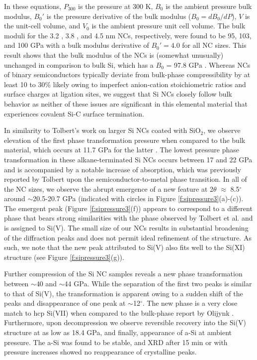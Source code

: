 In these equations, $P_{300}$ is the pressure at 300 K, $B_0$ is the ambient pressure bulk modulus, $B_0'$ is the pressure derivative of the bulk modulus ($B_0 = dB_0/dP$), $V$ is the unit-cell volume, and $V_0$ is the ambient pressure unit cell volume. The bulk moduli for the 3.2 , 3.8 , and 4.5 nm NCs, respectively, were found to be 95, 103, and 100 GPa with a bulk modulus derivative of $B_0' = 4.0$ for all NC sizes.  This result shows that the bulk modulus of the NCs is (somewhat unusually) unchanged in comparison to bulk Si, which has a $B_0$ = 97.8 GPa \cite{hull1999properties}. Whereas NCs of binary semiconductors typically deviate from bulk-phase compressibility by at least 10 to 30\% \cite{PhysRevLett.101.217401,qadri1996pressure} likely owing to imperfect anion-cation stoichiometric ratios and surface charges at ligation sites, we suggest that Si NCs closely follow bulk behavior as neither of these issues are significant in this elemental material that experiences covalent Si-C surface termination. \par

In similarity to Tolbert's work on larger Si NCs coated with SiO$_2$, we observe elevation of the first phase transformation pressure when compared to the bulk material, which occurs at 11.7 GPa for the latter \cite{katzke2007structural}. The lowest pressure phase transformation in these alkane-terminated Si NCs occurs between 17 and 22 GPa and is accompanied by a notable increase of absorption, which was previously reported by Tolbert upon the semiconductor-to-metal phase transition. In all of the NC sizes, we observe the abrupt emergence of a new feature at 2$\theta$ $\approx$ 8.5$^{\circ}$ around $\sim$20.5-20.7 GPa (indicated with circles in Figure \ref{f:sipressure3}(a)-(c)). The emergent peak (Figure \ref{f:sipressure3}(f)) appears to correspond to a different phase that bears strong similarities with the phase observed by Tolbert et al. and is assigned to Si(V). The small size of our NCs results in substantial broadening of the diffraction peaks and does not permit ideal refinement of the structure. As such, we note that the new peak attributed to Si(V) also fits well to the Si(XI) structure (see Figure \ref{f:sipressure3}(g)). \par

Further compression of the Si NC samples reveals a new phase transformation between $\sim$40 and $\sim$44 GPa. While the separation of the first two peaks is similar to that of Si(V), the transformation is apparent owing to a sudden shift of the peaks and disappearance of one peak at $\sim$12$^{\circ}$. The new phase is a very close match to hcp Si(VII) when compared to the bulk-phase report by Olijynk \cite{olijnyk1984structural}. Furthermore, upon decompression we observe reversible recovery into the Si(V) structure at as low as 18.4 GPa, and finally, appearance of a-Si at ambient pressure. The a-Si was found to be stable, and XRD after 15 min or with pressure increases showed no reappearance of crystalline peaks.

